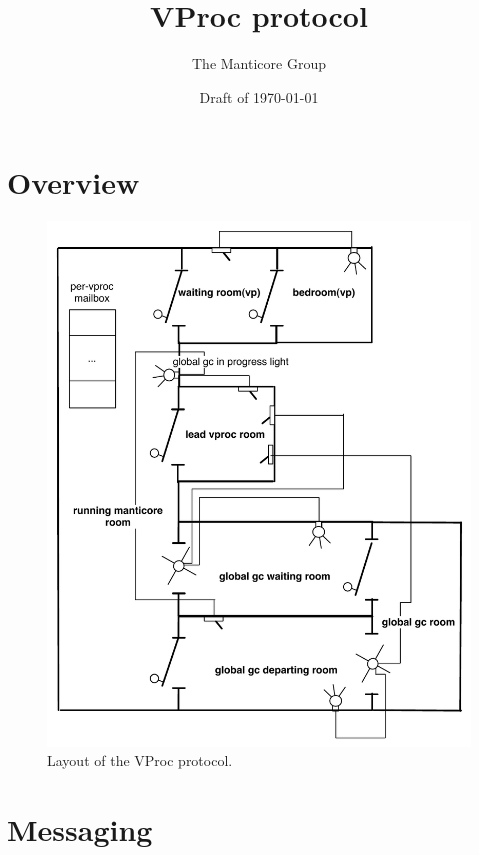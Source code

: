 \documentclass[11pt]{article}
\title{VProc protocol}
\author{The Manticore Group}
\date{Draft of \today}
\begin{document}
\maketitle

\section{Overview}

\begin{figure}[tp]
  \begin{center}
    \includegraphics[scale=0.8]{pictures/vproc-protocol}
  \end{center}%
  \caption{Layout of the VProc protocol.}
  \label{fig:vproc-protocol}
\end{figure}%

\section{Messaging}
\end{document}
